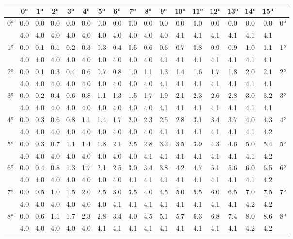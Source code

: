 \begin{footnotesize}\begin{tabular}{c || c | c | c | c | c | c | c | c | c | c | c | c | c | c | c | c || c}
		\space &0°&1°&2°&3°&4°&5°&6°&7°&8°&9°&10°&11°&12°&13°&14°&15°\\\hline\hline
		\multirow{2}{*}{0°}&0.0&0.0&0.0&0.0&0.0&0.0&0.0&0.0&0.0&0.0&0.0&0.0&0.0&0.0&0.0&0.0&\multirow{2}{*}{0°}\\ \space&4.0&4.0&4.0&4.0&4.0&4.0&4.0&4.0&4.0&4.0&4.1&4.1&4.1&4.1&4.1&4.1&\space\\\hline
		\multirow{2}{*}{1°}&0.0&0.1&0.1&0.2&0.3&0.3&0.4&0.5&0.6&0.6&0.7&0.8&0.9&0.9&1.0&1.1&\multirow{2}{*}{1°}\\ \space&4.0&4.0&4.0&4.0&4.0&4.0&4.0&4.0&4.0&4.1&4.1&4.1&4.1&4.1&4.1&4.1&\space\\\hline
		\multirow{2}{*}{2°}&0.0&0.1&0.3&0.4&0.6&0.7&0.8&1.0&1.1&1.3&1.4&1.6&1.7&1.8&2.0&2.1&\multirow{2}{*}{2°}\\ \space&4.0&4.0&4.0&4.0&4.0&4.0&4.0&4.0&4.0&4.1&4.1&4.1&4.1&4.1&4.1&4.1&\space\\\hline
		\multirow{2}{*}{3°}&0.0&0.2&0.4&0.6&0.8&1.1&1.3&1.5&1.7&1.9&2.1&2.3&2.6&2.8&3.0&3.2&\multirow{2}{*}{3°}\\ \space&4.0&4.0&4.0&4.0&4.0&4.0&4.0&4.0&4.0&4.1&4.1&4.1&4.1&4.1&4.1&4.1&\space\\\hline
		\multirow{2}{*}{4°}&0.0&0.3&0.6&0.8&1.1&1.4&1.7&2.0&2.3&2.5&2.8&3.1&3.4&3.7&4.0&4.3&\multirow{2}{*}{4°}\\ \space&4.0&4.0&4.0&4.0&4.0&4.0&4.0&4.0&4.0&4.1&4.1&4.1&4.1&4.1&4.1&4.2&\space\\\hline
		\multirow{2}{*}{5°}&0.0&0.3&0.7&1.1&1.4&1.8&2.1&2.5&2.8&3.2&3.5&3.9&4.3&4.6&5.0&5.4&\multirow{2}{*}{5°}\\ \space&4.0&4.0&4.0&4.0&4.0&4.0&4.0&4.0&4.1&4.1&4.1&4.1&4.1&4.1&4.1&4.2&\space\\\hline
		\multirow{2}{*}{6°}&0.0&0.4&0.8&1.3&1.7&2.1&2.5&3.0&3.4&3.8&4.2&4.7&5.1&5.6&6.0&6.5&\multirow{2}{*}{6°}\\ \space&4.0&4.0&4.0&4.0&4.0&4.0&4.0&4.1&4.1&4.1&4.1&4.1&4.1&4.1&4.1&4.2&\space\\\hline
		\multirow{2}{*}{7°}&0.0&0.5&1.0&1.5&2.0&2.5&3.0&3.5&4.0&4.5&5.0&5.5&6.0&6.5&7.0&7.5&\multirow{2}{*}{7°}\\ \space&4.0&4.0&4.0&4.0&4.0&4.0&4.1&4.1&4.1&4.1&4.1&4.1&4.1&4.1&4.2&4.2&\space\\\hline
		\multirow{2}{*}{8°}&0.0&0.6&1.1&1.7&2.3&2.8&3.4&4.0&4.5&5.1&5.7&6.3&6.8&7.4&8.0&8.6&\multirow{2}{*}{8°}\\ \space&4.0&4.0&4.0&4.0&4.0&4.1&4.1&4.1&4.1&4.1&4.1&4.1&4.1&4.1&4.2&4.2&\space\\\hline

\end{tabular}
\end{footnotesize}
